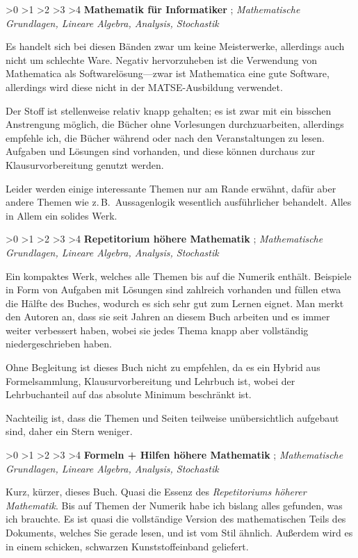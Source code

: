 \documentclass[english,ngerman,fontsize=9pt,intoc,index=totoc,refpage,listof=totoc,draft]{scrbook}
\numberwithin{equation}{section}
\newcommand{\ratingstar}{{\footnotesize \FiveStarShadow}}
\newcommand{\rating}[4]{\noindent\begin{flushright}
  \null\hfilneg%
  \ifnum #1>0 \ratingstar \fi
  \ifnum #1>1 \ratingstar \fi
  \ifnum #1>2 \ratingstar \fi
  \ifnum #1>3 \ratingstar \fi
  \ifnum #1>4 \ratingstar \fi
  \hspace{0.6667em}
  \textbf{\sffamily #2 \hfil\mbox{}}%
  \hspace{0.6667em}
  \cite{#3}; \emph{#4}
\end{flushright}}
\begin{document}
\rating{3}{Mathematik für Informatiker}
{Teschl1,Teschl2}
{Mathematische Grundlagen, Lineare Algebra, Analysis, Stoch\-as\-tik}

Es handelt sich bei diesen Bänden zwar um keine Meisterwerke, allerdings auch nicht um schlechte Ware.
Negativ hervorzuheben ist die Verwendung von Mathematica als Softwarelösung---zwar ist Mathematica eine gute Software, allerdings wird diese nicht in der MATSE-Ausbildung verwendet.

Der Stoff ist stellenweise relativ knapp gehalten; es ist zwar mit ein bisschen Anstrengung möglich, die Bücher ohne Vorlesungen durchzuarbeiten, allerdings empfehle ich, die Bücher während oder nach den Veranstaltungen zu lesen.
Aufgaben und Lösungen sind vorhanden, und diese können durchaus zur Klausurvorbereitung genutzt werden.

Leider werden einige interessante Themen nur am Rande erwähnt, dafür aber andere Themen wie z.\,B.~Aussagenlogik wesentlich ausführlicher behandelt.
Alles in Allem ein solides Werk.


\rating{4}{Repetitorium höhere Mathematik}
{Merziger2011}
{Mathematische Grundlagen, Lineare Algebra, Analysis, Stochastik}

Ein kompaktes Werk, welches alle Themen bis auf die Numerik enthält.
Beispiele in Form von Aufgaben mit Lösungen sind zahlreich vorhanden und füllen etwa die Hälfte des Buches, wodurch es sich sehr gut zum Lernen eignet.
Man merkt den Autoren an, dass sie seit Jahren an diesem Buch arbeiten und es immer weiter verbessert haben, wobei sie jedes Thema knapp aber vollständig niedergeschrieben haben.

Ohne Begleitung ist dieses Buch nicht zu empfehlen, da es ein Hybrid aus Formelsammlung, Klausurvorbereitung und Lehrbuch ist, wobei der Lehr\-buch\-an\-teil auf das absolute Minimum beschränkt ist.

Nachteilig ist, dass die Themen und Seiten teilweise unübersichtlich aufgebaut sind, daher ein Stern weniger.


\rating{5}{Formeln + Hilfen höhere Mathematik}
{Merziger2010}
{Mathematische Grundlagen, Lineare Algebra, Analysis, Stochastik}

Kurz, kürzer, dieses Buch.
Quasi die Essenz des \emph{Repetitoriums höherer Mathematik}.
Bis auf Themen der Numerik habe ich bislang alles gefunden, was ich brauchte.
Es ist quasi die vollständige Version des mathematischen Teils des Dokuments, welches Sie gerade lesen, und ist vom Stil ähnlich.
Außerdem wird es in einem schicken, schwarzen Kunststoffeinband geliefert.
\end{document}

